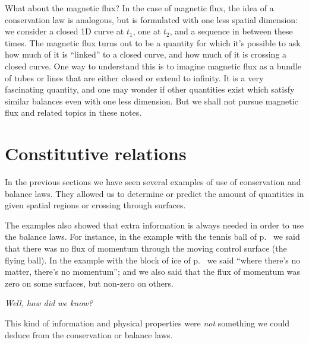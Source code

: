 \documentclass[a4paper,12pt,%
onecolumn,oneside,titlepage,%
british%
]{memoir}
\renewcommand*{\|}[1][]{\nonscript\:#1\vert\nonscript\:\mathopen{}}
\begin{document}
\begin{extra}{What about the magnetic flux?}
  In the case of magnetic flux, the idea of a conservation law is analogous, but is formulated with one less spatial dimension: we consider a closed 1D curve at $t_{1}$, one at $t_{2}$, and a sequence in between these times. The magnetic flux turns out to be a quantity for which it's possible to ask how much of it is \enquote{linked} to a closed curve, and how much of it is crossing a closed curve. One way to understand this is to imagine magnetic flux as a bundle of tubes or lines that are either closed or extend to infinity. It is a very fascinating quantity, and one may wonder if other quantities exist which satisfy similar balances even with one less dimension. But we shall not pursue magnetic flux and related topics in these notes.
\end{extra}


\section{Constitutive relations}
\label{sec:constitutive}

In the previous sections we have seen several examples of use of conservation and balance laws. They allowed us to determine or predict the amount of quantities in given spatial regions or crossing through surfaces.

The examples also showed that extra information is always needed in order to use the balance laws. For instance, in the example with the tennis ball of p.~\pageref{sec:example_balance_vect} we said that there was no flux of momentum through the moving control surface (the flying ball). In the example with the block of ice of p.~\pageref{sec:example_balance_static} we said \enquote{where there's no matter, there's no momentum}; and we also said that the flux of momentum was zero on some surfaces, but non-zero on others.

\emph{Well, how did we know?}

This kind of information and physical properties were \emph{not} something we could deduce from the conservation or balance laws.
\end{document}

